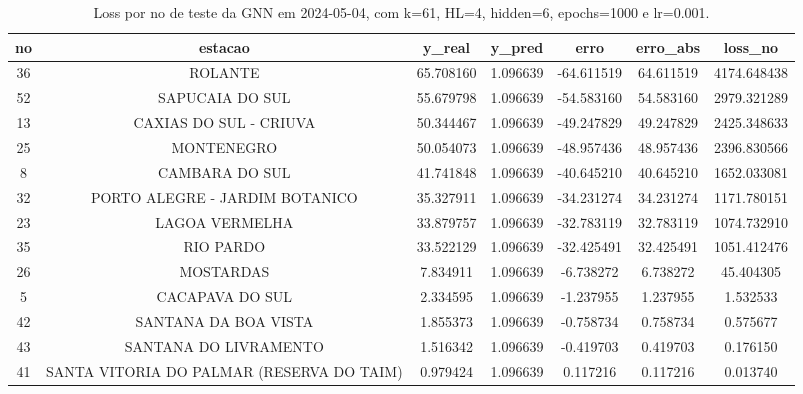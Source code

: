 \begin{table}[h]
\centering
\caption{Loss por no de teste da GNN em 2024-05-04, com k=61, HL=4, hidden=6, epochs=1000 e lr=0.001.}
\label{tab:gnn_loss_k61_hl4_h6_e1000_d20240504}
\begin{tabular}{ccccccc}
\toprule
no & estacao & y\_real & y\_pred & erro & erro\_abs & loss\_no \\
\midrule
36 & ROLANTE & 65.708160 & 1.096639 & -64.611519 & 64.611519 & 4174.648438 \\
52 & SAPUCAIA DO SUL & 55.679798 & 1.096639 & -54.583160 & 54.583160 & 2979.321289 \\
13 & CAXIAS DO SUL - CRIUVA & 50.344467 & 1.096639 & -49.247829 & 49.247829 & 2425.348633 \\
25 & MONTENEGRO & 50.054073 & 1.096639 & -48.957436 & 48.957436 & 2396.830566 \\
8 & CAMBARA DO SUL & 41.741848 & 1.096639 & -40.645210 & 40.645210 & 1652.033081 \\
32 & PORTO ALEGRE - JARDIM BOTANICO & 35.327911 & 1.096639 & -34.231274 & 34.231274 & 1171.780151 \\
23 & LAGOA VERMELHA & 33.879757 & 1.096639 & -32.783119 & 32.783119 & 1074.732910 \\
35 & RIO PARDO & 33.522129 & 1.096639 & -32.425491 & 32.425491 & 1051.412476 \\
26 & MOSTARDAS & 7.834911 & 1.096639 & -6.738272 & 6.738272 & 45.404305 \\
5 & CACAPAVA DO SUL & 2.334595 & 1.096639 & -1.237955 & 1.237955 & 1.532533 \\
42 & SANTANA DA BOA VISTA & 1.855373 & 1.096639 & -0.758734 & 0.758734 & 0.575677 \\
43 & SANTANA DO LIVRAMENTO & 1.516342 & 1.096639 & -0.419703 & 0.419703 & 0.176150 \\
41 & SANTA VITORIA DO PALMAR (RESERVA DO TAIM) & 0.979424 & 1.096639 & 0.117216 & 0.117216 & 0.013740 \\
\bottomrule
\end{tabular}
\end{table}
